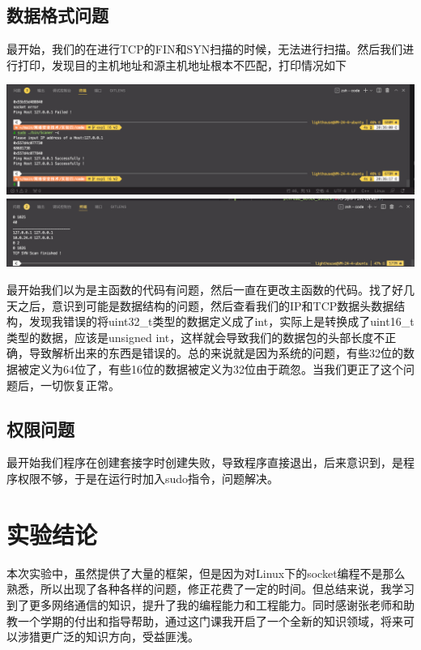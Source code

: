 \documentclass[UTF8,a4paper,10pt]{ctexart}
\begin{document}
\subsection{数据格式问题}
最开始，我们的在进行TCP的FIN和SYN扫描的时候，无法进行扫描。然后我们进行打印，发现目的主机地址和源主机地址根本不匹配，打印情况如下
\begin{center}
    \includegraphics*[scale = 0.5]{img/5}
    \includegraphics*[scale = 0.3]{img/6}
\end{center}
最开始我们以为是主函数的代码有问题，然后一直在更改主函数的代码。找了好几天之后，意识到可能是数据结构的问题，然后查看我们的IP和TCP数据头数据结构，发现我错误的将uint32\_t类型的数据定义成了int，实际上是转换成了uint16\_t类型的数据，应该是unsigned int，这样就会导致我们的数据包的头部长度不正确，导致解析出来的东西是错误的。总的来说就是因为系统的问题，有些32位的数据被定义为64位了，有些16位的数据被定义为32位由于疏忽。当我们更正了这个问题后，一切恢复正常。

\subsection{权限问题}
最开始我们程序在创建套接字时创建失败，导致程序直接退出，后来意识到，是程序权限不够，于是在运行时加入sudo指令，问题解决。
\section{实验结论}
本次实验中，虽然提供了大量的框架，但是因为对Linux下的socket编程不是那么熟悉，所以出现了各种各样的问题，修正花费了一定的时间。但总结来说，我学习到了更多网络通信的知识，提升了我的编程能力和工程能力。同时感谢张老师和助教一个学期的付出和指导帮助，通过这门课我开启了一个全新的知识领域，将来可以涉猎更广泛的知识方向，受益匪浅。
\end{document}
